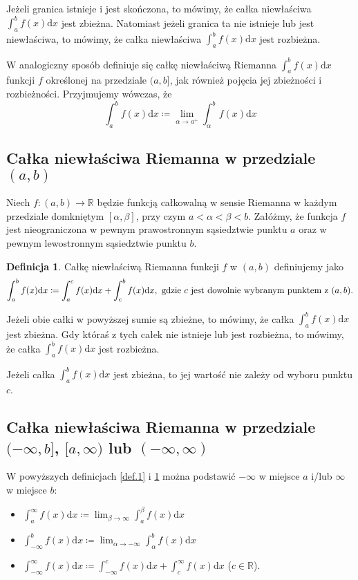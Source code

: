 \documentclass{article}
\numberwithin{equation}{section}
\theoremstyle{definition}
\newtheorem{definition}{Definicja}[section]
\theoremstyle{case}
\newcommand*{\R}{\mathbb{R}}
\begin{document}
	Jeżeli granica istnieje i jest skończona, to mówimy, że całka niewłaściwa ${\int_a^b f(x) \mathrm{d}x }$ jest zbieżna. Natomiast jeżeli granica ta nie istnieje lub jest niewłaściwa, to mówimy, że całka niewłaściwa ${\int_a^b f(x) \mathrm{d}x}$ jest rozbieżna.

W analogiczny sposób definiuje się całkę niewłaściwą Riemanna ${\int_a^b f(x) \mathrm{d}x}$ funkcji $f$ określonej na przedziale ${(a,b]}$, jak również pojęcia jej zbieżności i rozbieżności. Przyjmujemy wówczas, że
\begin{equation*}
	\int_a^b f(x) \mathrm{d}x \coloneqq \lim_{\alpha \to a^+} \int_{\alpha}^b f(x) \mathrm{d}x
\end{equation*}

\subsection{Całka niewłaściwa Riemanna w przedziale $(a,b)$}
Niech ${f \colon (a, b) \to \R}$ będzie funkcją całkowalną w sensie Riemanna
w każdym przedziale domkniętym $[\alpha,\beta]$, przy czym $a < \alpha < \beta < b$.
Załóżmy, że funkcja $f$ jest nieograniczona w pewnym prawostronnym sąsiedztwie punktu $a$ oraz
w pewnym lewostronnym sąsiedztwie punktu $b$.
\begin{definition}
	\label{def.2}
	Całkę niewłaściwą Riemanna funkcji $f$ w $(a,b)$ definiujemy jako
	\begin{equation*}
		\int_a^b f(x) \mathrm{d}x
		\coloneqq
		\int_a^c f(x) \mathrm{d}x + \int_c^b f(x) \mathrm{d}x
		\textnormal{,\enskip gdzie $c$ jest dowolnie wybranym punktem z $(a,b)$.}
	\end{equation*}
\end{definition}
Jeżeli obie całki w powyższej sumie są zbieżne, to mówimy,
że całka $\int_a^b f(x) \mathrm{d}x$ jest zbieżna.
Gdy któraś z tych całek nie istnieje lub jest rozbieżna, to mówimy,
że całka $\int_a^b f(x) \mathrm{d}x$ jest rozbieżna.

Jeżeli całka $\int_a^b f(x) \mathrm{d}x$ jest zbieżna, to jej wartość nie zależy od wyboru punktu $c$.

\subsection{Całka niewłaściwa Riemanna w przedziale
\texorpdfstring{$(-\infty,b]$}{(-inf,b]},
\texorpdfstring{$[a,\infty)$}{[a,+inf)} lub
	\texorpdfstring{$(-\infty,\infty)$}{(-inf,+inf)}
}
W powyższych definicjach \ref{def.1} i \ref{def.2} można podstawić $-\infty$ w miejsce $a$ i/lub $\infty$ w miejsce $b$:
\begin{itemize}
	\item
		$\int_a^{\infty} f(x) \mathrm{d}x
		\coloneqq
		\lim_{\beta \to \infty} \int_a^{\beta} f(x) \mathrm{d}x$
	\item
		$\int_{-\infty}^b f(x) \mathrm{d}x
		\coloneqq
		\lim_{\alpha \to -\infty} \int_{\alpha}^b f(x) \mathrm{d}x$
	\item
		$\int_{-\infty}^{\infty} f(x) \mathrm{d}x
		\coloneqq
		\int_{-\infty}^{c} f(x) \mathrm{d}x + \int_{c}^{\infty} f(x) \mathrm{d}x$ ($c \in \R$).
\end{itemize}
\end{document}
